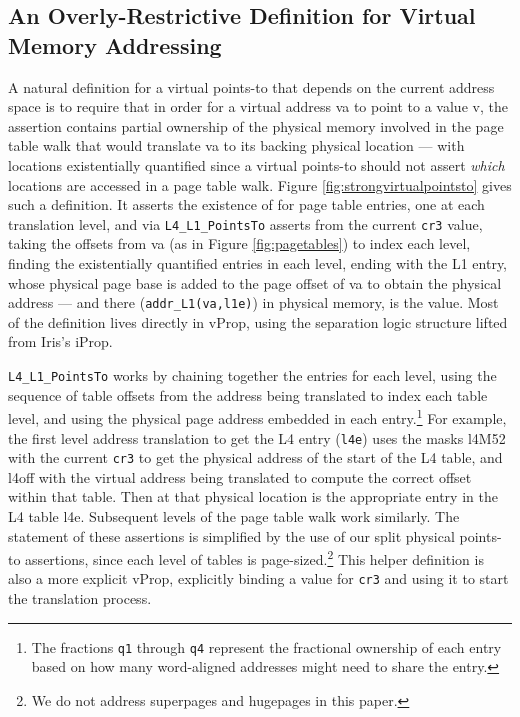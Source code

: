 \subsection{An Overly-Restrictive Definition for Virtual Memory Addressing}
\label{sec:overly-restrictive}
A natural definition for a virtual points-to that depends on the current address space is to
require that in order for a virtual address \textsf{va} to point to a value \textsf{v}, the assertion contains
partial ownership of the physical memory involved in the page table walk that would translate \textsf{va} to
its backing physical location --- with locations existentially quantified since a virtual points-to should not assert
\emph{which} locations are accessed in a page table walk.
Figure \ref{fig:strongvirtualpointsto} gives such a definition.
It asserts the existence of for page table entries, one at each translation level, and via \lstinline|L4_L1_PointsTo|
asserts from the current \lstinline|cr3| value, taking the offsets from \textsf{va} (as in Figure \ref{fig:pagetables})
to index each level, finding the existentially quantified entries in each level, 
ending with the L1 entry, whose physical page base is added to the page offset of \textsf{va} to obtain the physical address
 --- and there (\lstinline|addr_L1(va,l1e)|) in physical memory, is the value.
Most of the definition lives directly in \textsf{vProp}, using the separation logic structure lifted from Iris's \textsf{iProp}.

\lstinline|L4_L1_PointsTo| works by
chaining together the entries for each level, using the sequence of table offsets from the address being translated to index
each table level, and using the physical page address embedded in each entry.\footnote{
  The fractions \lstinline|q1| through \lstinline|q4| represent the fractional ownership of each entry based on how many
  word-aligned addresses might need to share the entry.
}
For example, 
  the first level address translation to get the L4 entry (\lstinline|l4e|) 
  uses the masks \textsf{l4M52} with the current \lstinline|cr3| to get the 
  physical address of the start of the L4 table,
  and \textsf{l4off} with the virtual address being translated to compute the correct offset within that table.
  Then at that physical location is the appropriate entry in the L4 table \textsf{l4e}.
  Subsequent levels of the page table walk work similarly.
The statement of these assertions is simplified by the use of our split physical points-to assertions, since
each level of tables is page-sized.\footnote{We do not address superpages and hugepages in this paper.}
This helper definition is also a more explicit \textsf{vProp}, explicitly binding a value for \lstinline|cr3| and using it
to start the translation process.


